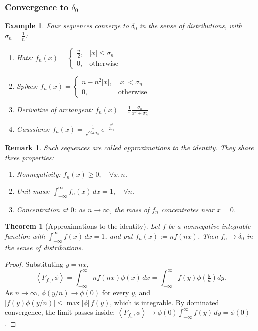 \documentclass{article}
\newtheorem{theorem}{Theorem}
\newtheorem*{example}{Example}
\newtheorem{remark}{Remark}
\newcommand{\ip}[2]{\left\langle #1, #2 \right\rangle}
\newcommand{\intinf}{\int_{-\infty}^{\infty}}
\begin{document}
\subsubsection{Convergence to $\delta_0$}
\begin{example}
    Four sequences converge to $\delta_0$ in the sense of distributions, with $\sigma_n=\frac1n$:
    \begin{enumerate}
        \item Hats: $f_n(x) = \begin{cases}\frac{n}{2}, & |x|\leq\sigma_n\\0, & \text{otherwise}\end{cases}$
        \item Spikes: $f_n(x) = \begin{cases}n-n^2|x|, & |x|<\sigma_n\\0, & \text{otherwise}\end{cases}$
        \item Derivative of arctangent: $f_n(x) = \frac{1}{\pi}\frac{\sigma_n}{x^2+\sigma_n^2}$
        \item Gaussians: $f_n(x) = \frac{1}{\sqrt{2\pi\sigma_n}}e^{-\frac{x^2}{2\sigma_n}}$
    \end{enumerate}
\end{example}
\begin{remark}
    Such sequences are called approximations to the identity. They share three properties:
    \begin{enumerate}
        \item Nonnegativity: $f_n(x)\geq 0,\quad\forall x,n$.
        \item Unit mass: $\intinf f_n(x)\,dx = 1,\quad \forall n$.
        \item Concentration at $0$: as $n\to\infty$, the mass of $f_n$ concentrates near $x=0$.
    \end{enumerate}
\end{remark}
\begin{theorem}[Approximations to the identity]
    Let $f$ be a nonnegative integrable function with $\intinf f(x)\,dx = 1$, and put $f_n(x) := nf(nx)$. Then $f_n\to\delta_0$ in the sense of distributions.
\end{theorem}
\begin{proof}
    Substituting $y=nx$,
    \[\ip{F_{f_n}}{\phi} = \intinf nf(nx)\phi(x)\,dx = \intinf f(y)\phi\left(\tfrac{y}{n}\right)dy.\]
    As $n\to\infty$, $\phi(y/n)\to\phi(0)$ for every $y$, and $|f(y)\phi(y/n)|\leq \max|\phi|\,f(y)$, which is integrable. By dominated convergence, the limit passes inside: $\ip{F_{f_n}}{\phi}\to\phi(0)\intinf f(y)\,dy = \phi(0)$.
\end{proof}
\end{document}
